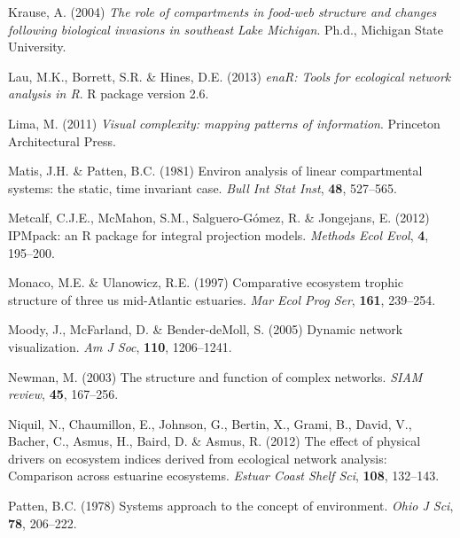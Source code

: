 \documentclass[11pt]{article}
\begin{document}
\begin{thebibliography}{75}
Krause, A. (2004) \emph{The role of compartments in food-web structure and
  changes following biological invasions in southeast {Lake Michigan}}.
\newblock Ph.d., Michigan State University.

Lau, M.K., Borrett, S.R. \& Hines, D.E. (2013) \emph{enaR: Tools for ecological
  network analysis in R}.
\newblock R package version 2.6.

Lima, M. (2011) \emph{Visual complexity: mapping patterns of information}.
\newblock Princeton Architectural Press.

Matis, J.H. \& Patten, B.C. (1981) Environ analysis of linear compartmental
  systems: the static, time invariant case.
\newblock \emph{Bull Int Stat Inst}, \textbf{48}, 527--565.

Metcalf, C.J.E., McMahon, S.M., Salguero-G{\'o}mez, R. \& Jongejans, E. (2012)
  {IPM}pack: an {R} package for integral projection models.
\newblock \emph{Methods Ecol Evol}, \textbf{4}, 195--200.

Monaco, M.E. \& Ulanowicz, R.E. (1997) Comparative ecosystem trophic structure
  of three us mid-{A}tlantic estuaries.
\newblock \emph{Mar Ecol Prog Ser}, \textbf{161}, 239--254.

Moody, J., McFarland, D. \& Bender-deMoll, S. (2005) Dynamic network
  visualization.
\newblock \emph{Am J Soc}, \textbf{110}, 1206--1241.

Newman, M. (2003) The structure and function of complex networks.
\newblock \emph{SIAM review}, \textbf{45}, 167--256.

Niquil, N., Chaumillon, E., Johnson, G., Bertin, X., Grami, B., David, V.,
  Bacher, C., Asmus, H., Baird, D. \& Asmus, R. (2012) The effect of physical
  drivers on ecosystem indices derived from ecological network analysis:
  Comparison across estuarine ecosystems.
\newblock \emph{Estuar Coast Shelf Sci}, \textbf{108}, 132--143.

Patten, B.C. (1978) Systems approach to the concept of environment.
\newblock \emph{Ohio J Sci}, \textbf{78}, 206--222.


\end{thebibliography}
\end{document}
